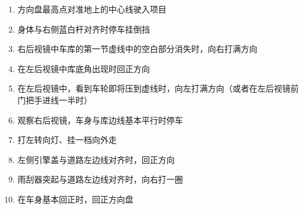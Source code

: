 \begin{enumerate}
    \item 方向盘最高点对准地上的中心线驶入项目
    \item 身体与右侧蓝白杆对齐时停车挂倒挡
    \item 右后视镜中车库的第一节虚线中的空白部分消失时，向右打满方向
    \item 在左后视镜中库底角出现时回正方向
    \item 在左后视镜中，看到车轮即将压到虚线时，向左打满方向（或者在左后视镜前门把手进线一半时）
    \item 观察右后视镜，车身与库边线基本平行时停车
    \item 打左转向灯、挂一档向外走
    \item 左侧引擎盖与道路左边线对齐时，回正方向
    \item 雨刮器突起与道路左边线对齐时，向右打一圈
    \item 在车身基本回正时，回正方向盘
\end{enumerate}
